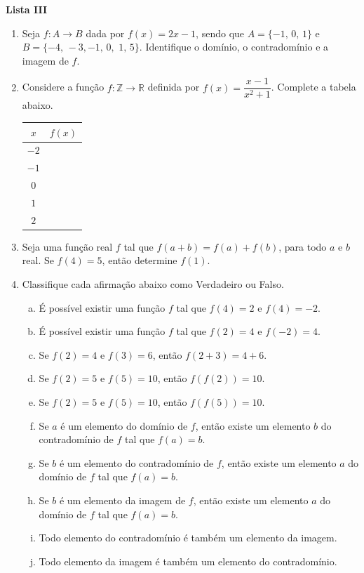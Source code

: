 \documentclass[12pt,a4paper]{article}
\begin{document}
\begin{center}
  \textbf{Lista III}
\end{center}

\begin{enumerate}
  \item Seja $f:A\to B$ dada por $f(x) = 2x - 1$, sendo que
    $A = \{-1,\,0,\,1\}$ e $B = \{-4,\,-3,-1,\,0,\,\,1,\,5\}$.
    Identifique o domínio, o contradomínio e a imagem de $f$.

  \item Considere a função $f:\mathbb{Z}\to\mathbb{R}$ definida por $f(x)=\dfrac{x - 1}{x^2 + 1}$. 
    Complete a tabela abaixo.

    \begin{table}[H]
      \centering
      \begin{tabular}{c|c}
          $x$ & $f(x)$ \\ \hline
          $-2$ &  \\ \hline
          $-1$ &  \\ \hline
          $0$ &  \\ \hline
          $1$ &  \\ \hline
          $2$ &
      \end{tabular}
    \end{table}
    
  \item Seja uma função real $f$ tal que $f(a + b) = f(a) + f(b)$, para 
  todo $a$ e $b$ real. Se $f(4) = 5$, então determine $f(1)$.

  \item Classifique cada afirmação abaixo como Verdadeiro ou Falso.
    \begin{enumerate}[(a)]
      \item É possível existir uma função $f$ tal que $f(4) = 2$ e $f(4) = -2$.
      \item É possível existir uma função $f$ tal que $f(2) = 4$ e $f(-2) = 4$.
      \item Se $f(2) = 4$ e $f(3) = 6$, então $f(2 + 3) = 4 + 6$.
      \item Se $f(2) = 5$ e $f(5) = 10$, então $f(f(2)) = 10$.
      \item Se $f(2) = 5$ e $f(5) = 10$, então $f(f(5)) = 10$.
      \item Se $a$ é um elemento do domínio de $f$, então existe um elemento $b$
        do contradomínio de $f$ tal que $f(a) = b$.
      \item Se $b$ é um elemento do contradomínio de $f$, então existe um elemento $a$
        do domínio de $f$ tal que $f(a) = b$.
      \item Se $b$ é um elemento da imagem de $f$, então existe um elemento $a$
        do domínio de $f$ tal que $f(a) = b$.
      \item Todo elemento do contradomínio é também um elemento da imagem.
      \item Todo elemento da imagem é também um elemento do contradomínio.
    \end{enumerate}
    
\end{enumerate}
\end{document}

